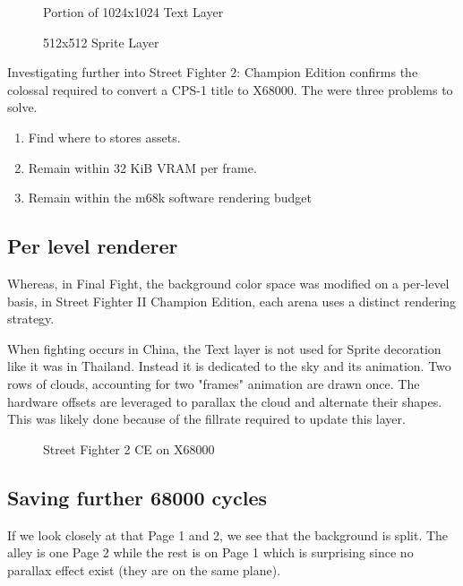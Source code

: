 \begin{minipage}[t]{0.49\linewidth}
  \begin{figure}[H]
  \caption*{Portion of 1024x1024 Text Layer}
  \end{figure}
\end{minipage}%
\hfill
\begin{minipage}[t]{0.49\linewidth}
   \begin{figure}[H]
  \caption*{512x512 Sprite Layer}
  \end{figure}
\end{minipage}%

\pagebreak

Investigating further into Street Fighter 2: Champion Edition confirms the colossal required to convert a CPS-1 title to X68000. The were three problems to solve.

\begin{enumerate}
\item Find where to stores assets.
\item Remain within 32 KiB VRAM per frame.
\item Remain within the m68k software rendering budget
\end{enumerate}

\subsection{Per level renderer}
Whereas, in Final Fight, the background color space was modified on a per-level basis, in Street Fighter II Champion Edition, each arena uses a distinct rendering strategy.

When fighting occurs in China, the Text layer is not used for Sprite decoration like it was in Thailand. Instead it is dedicated to the sky and its animation. Two rows of clouds, accounting for two "frames" animation are drawn once. The hardware offsets are leveraged to parallax the cloud and alternate their shapes. This was likely done because of the fillrate required to update this layer.



\begin{figure}[H]
\caption*{Street Fighter 2 CE on X68000}
\end{figure}


\subsection{Saving further 68000 cycles}
If we look closely at that Page 1 and 2, we see that the background is split. The alley is one Page 2 while the rest is on Page 1 which is surprising since no parallax effect exist (they are on the same plane). 

